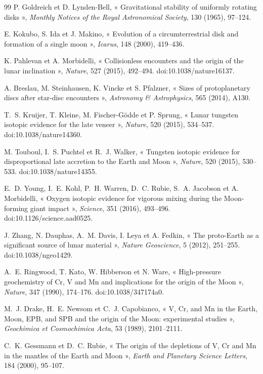 \documentclass[11pt,a4paper,openany]{report}
\begin{document}
\begin{thebibliography}{99}
 P. Goldreich et D. Lynden-Bell, « Gravitational stability of
uniformly rotating disks », \emph{Monthly Notices of the Royal Astronomical Society}, 130 (1965),
97--124.

 E. Kokubo, S. Ida et J. Makino, « Evolution of a circumterrestrial disk and
formation of a single moon », \emph{Icarus}, 148 (2000), 419--436.

 K. Pahlevan et A. Morbidelli, « Collisionless encounters and the
origin of the lunar inclination », \emph{Nature}, 527 (2015), 492--494. doi:10.1038/nature16137.

 A. Breslau, M. Steinhausen, K. Vincke et S. Pfalzner, « Sizes of
protoplanetary discs after star-disc encounters », \emph{Astronomy \& Astrophysics}, 565 (2014),
A130.

 T.~S. Kruijer, T. Kleine, M. Fischer-Gödde et P. Sprung, « Lunar tungsten
isotopic evidence for the late veneer », \emph{Nature}, 520 (2015), 534--537.
doi:10.1038/nature14360.

 M. Touboul, I.~S. Puchtel et R.~J. Walker, « Tungsten isotopic evidence for
disproportional late accretion to the Earth and Moon », \emph{Nature}, 520 (2015), 530--533.
doi:10.1038/nature14355.

 E.~D. Young, I.~E. Kohl, P.~H. Warren, D.~C. Rubie, S.~A. Jacobson et
A. Morbidelli, « Oxygen isotopic evidence for vigorous mixing during the Moon-forming giant
impact », \emph{Science}, 351 (2016), 493--496. doi:10.1126/science.aad0525.

 J. Zhang, N. Dauphas, A.~M. Davis, I. Leya et A. Fedkin, « The proto-Earth as
a significant source of lunar material », \emph{Nature Geoscience}, 5 (2012), 251--255.
doi:10.1038/ngeo1429.


 A.~E. Ringwood, T. Kato, W. Hibberson et N. Ware, « High-pressure
geochemistry of Cr, V and Mn and implications for the origin of the Moon », \emph{Nature}, 347
(1990), 174--176. doi:10.1038/347174a0.

 M.~J. Drake, H.~E. Newsom et C.~J. Capobianco, « V, Cr, and Mn in the Earth,
Moon, EPB, and SPB and the origin of the Moon: experimental studies », \emph{Geochimica et
Cosmochimica Acta}, 53 (1989), 2101--2111.

 C.~K. Gessmann et D.~C. Rubie, « The origin of the depletions of V,
Cr and Mn in the mantles of the Earth and Moon », \emph{Earth and Planetary Science Letters}, 184
(2000), 95--107.


\end{thebibliography}
\end{document}
